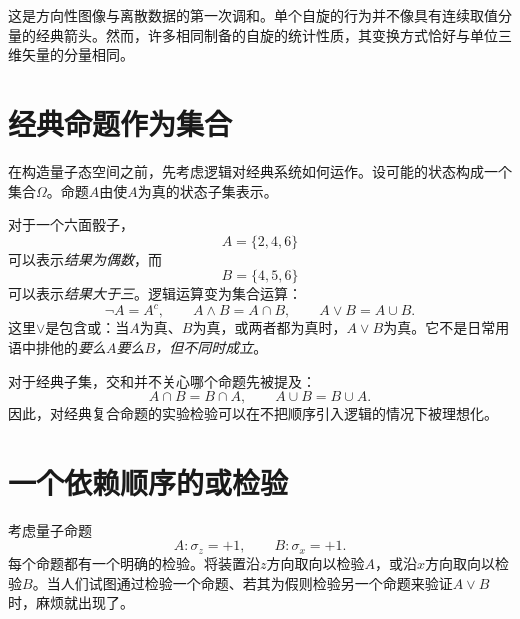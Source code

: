 \begin{classroomqa}
\end{classroomqa}

这是方向性图像与离散数据的第一次调和。单个自旋的行为并不像具有连续取值分量的经典箭头。然而，许多相同制备的自旋的统计性质，其变换方式恰好与单位三维矢量的分量相同。

\section{经典命题作为集合}

在构造量子态空间之前，先考虑逻辑对经典系统如何运作。设可能的状态构成一个集合\(\Omega\)。命题\(A\)由使\(A\)为真的状态子集表示。

对于一个六面骰子，
\[
A=\{2,4,6\}
\]
可以表示\emph{结果为偶数}，而
\[
B=\{4,5,6\}
\]
可以表示\emph{结果大于三}。逻辑运算变为集合运算：
\begin{equation}
\neg A=A^c,\qquad
A\land B=A\cap B,\qquad
A\lor B=A\cup B.
\label{eq:classical-logic}
\end{equation}
这里\(\lor\)是包含或：当\(A\)为真、\(B\)为真，或两者都为真时，\(A\lor B\)为真。它不是日常用语中排他的\emph{要么\(A\)要么\(B\)，但不同时成立}。

\begin{classroomqa}
\end{classroomqa}

对于经典子集，交和并不关心哪个命题先被提及：
\[
A\cap B=B\cap A,\qquad A\cup B=B\cup A.
\]
因此，对经典复合命题的实验检验可以在不把顺序引入逻辑的情况下被理想化。

\section{一个依赖顺序的或检验}

考虑量子命题
\begin{equation}
A:\sigma_z=+1,\qquad B:\sigma_x=+1.
\end{equation}
每个命题都有一个明确的检验。将装置沿\(z\)方向取向以检验\(A\)，或沿\(x\)方向取向以检验\(B\)。当人们试图通过检验一个命题、若其为假则检验另一个命题来验证\(A\lor B\)时，麻烦就出现了。

